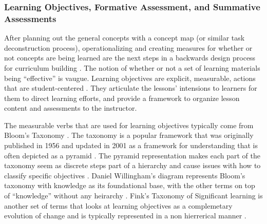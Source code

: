 \documentclass[010-intro.tex]{subfiles}
\begin{document}
        \subsubsection{Learning Objectives, Formative Assessment, and Summative Assessments}

        After planning out the general concepts with a concept map (or similar task deconstruction process),
        operationalizing and creating measures for whether or not concepts are being learned are the next
        steps in a backwards design process for curriculum building
        \cite{wilson2019teaching}.
        The notion of whether or not a set of learning materials being ``effective'' is vaugue.
        Learning objectives are explicit, measurable, actions that are student-centered
        \cite{ambrose2010learning}.
        They articulate the lessons' intensions to learners for them to direct learning efforts,
        and provide a framework to organize lesson content and assessments to the instructor.

        The measurable verbs that are used for learning objectives typically come from Bloom's Taxonomy
        \cite{ambrose2010learning, wilson2019teaching, anderson2001taxonomy}.
        The taxonomy is a popular framework that was originally published in 1956 and updated in 2001
        as a framework for understanding that is often depicted as a pyramid
        \cite{bloomTaxonomyEducationalObjectives1956, anderson2001taxonomy}.
        The pyramid representation makes each part of the taxonomy seem as discrete steps part of a hierarchy
        and cause issues with how to classify specific objectives
        \cite{masapanta-carrionSystematicReviewUse2018}.
        Daniel Willingham's diagram represents Bloom's taxonomy with knowledge as its foundational base,
        with the other terms on top of ``knowledge'' without any heirarchy
        \cite{DonaldClarkPlan2020}.
        Fink's Taxonomy of Significant learning is another set of terms that looks at learning objectives as a complemetary
        evolution of change and is typically represented in a non hierrerical manner
        \cite{finkCreatingSignificantLearning2013}.
\end{document}
